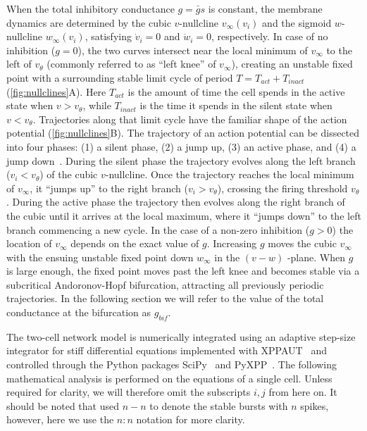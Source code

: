 When the total inhibitory conductance $g = \bar g s$ is constant, the membrane dynamics are determined by the cubic $v$-nullcline $v_{\infty}(v_i)$ and the sigmoid $w$-nullcline $w_{\infty}(v_{i})$, satisfying $\dot v_{i}=0$ and $\dot w_{i}=0$, respectively.
In case of no inhibition ($g=0$), the two curves intersect near the local minimum of $v_{\infty}$ to the left of $v_{\theta}$ (commonly referred to as ``left knee'' of $v_{\infty}$), creating an unstable fixed point with a surrounding stable limit cycle of period $T=T_{act}+T_{inact}$ (\cref{fig:nullclines}A).
Here $T_{act}$ is the amount of time the cell spends in the active state when $v>v_\theta$, while $T_{inact}$ is the time it spends in the silent state when $v<v_\theta$.
Trajectories along that limit cycle have the familiar shape of the action potential (\cref{fig:nullclines}B).
The trajectory of an action potential can be dissected into four phases: (1) a silent phase, (2) a jump up, (3) an active phase, and (4) a jump down~\citep[see e.g.][]{ermentrout2010}.
During the silent phase the trajectory evolves along the left branch ($v_{i}<v_{\theta}$) of the cubic $v$-nullcline.
Once the trajectory reaches the local minimum of $v_{\infty}$, it ``jumps up'' to the right branch ($v_{i}>v_{\theta}$), crossing the firing threshold $v_{\theta}$.
During the active phase the trajectory then evolves along the right branch of the cubic until it arrives at the local maximum, where it ``jumps down'' to the left branch commencing a new cycle.
In the case of a non-zero inhibition ($g>0$) the location of $v_{\infty}$ depends on the exact value of $g$.
Increasing $g$ moves the cubic $v_{\infty}$ with the ensuing unstable fixed point down $w_{\infty}$ in the $(v-w)$ -plane.
When $g$ is large enough, the fixed point moves past the left knee and becomes stable via a subcritical Andoronov-Hopf bifurcation, attracting all previously periodic trajectories.
In the following section we will refer to the value of the total conductance at the bifurcation as $g_{bif}$.

The two-cell network model is numerically integrated using an adaptive step-size integrator for stiff differential equations implemented with XPPAUT~\citep{ermentrout2002} and controlled through the Python packages SciPy~\citep{scipy2020} and PyXPP~\citep{pyxpp}.
The following mathematical analysis is performed on the equations of a single cell.
Unless required for clarity, we will therefore omit the subscripts $i,j$ from here on.
It should be noted that \citep{bose2011} used $n-n$ to denote the stable bursts with $n$ spikes, however, here we use the $n:n$ notation for more clarity.
